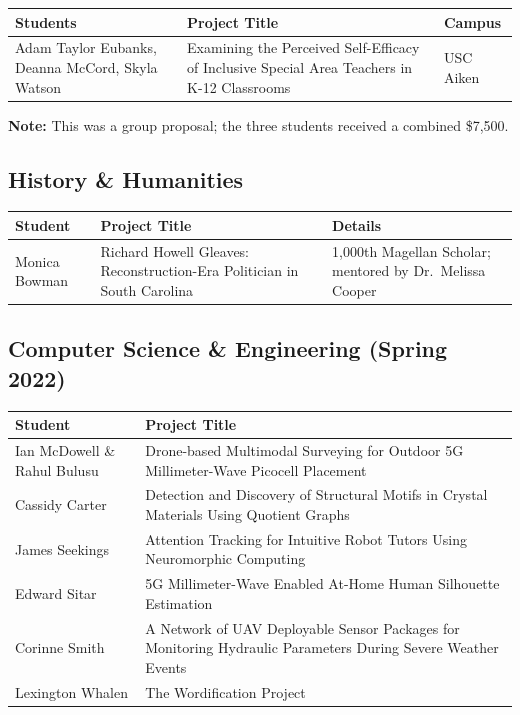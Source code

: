 \documentclass[11pt, letterpaper]{article}
\begin{document}
\begin{longtable}{@{}p{5cm} p{7.5cm} p{2cm}@{}}
\toprule
\textbf{Students} & \textbf{Project Title} & \textbf{Campus} \\
\midrule
\endhead
Adam Taylor Eubanks, Deanna McCord, Skyla Watson & Examining the Perceived Self-Efficacy of Inclusive Special Area Teachers in K-12 Classrooms & USC Aiken \\
\bottomrule
\end{longtable}

\textbf{Note:} This was a group proposal; the three students received a combined \$7,500.

\subsection{History \& Humanities}

\begin{longtable}{@{}p{3.5cm} p{7.5cm} p{3.5cm}@{}}
\toprule
\textbf{Student} & \textbf{Project Title} & \textbf{Details} \\
\midrule
\endhead
Monica Bowman & Richard Howell Gleaves: Reconstruction-Era Politician in South Carolina & 1,000th Magellan Scholar; mentored by Dr.\ Melissa Cooper \\
\bottomrule
\end{longtable}

\subsection{Computer Science \& Engineering (Spring 2022)}

\begin{longtable}{@{}p{3.5cm} p{10.5cm}@{}}
\toprule
\textbf{Student} & \textbf{Project Title} \\
\midrule
\endhead
Ian McDowell \& Rahul Bulusu & Drone-based Multimodal Surveying for Outdoor 5G Millimeter-Wave Picocell Placement \\
Cassidy Carter & Detection and Discovery of Structural Motifs in Crystal Materials Using Quotient Graphs \\
James Seekings & Attention Tracking for Intuitive Robot Tutors Using Neuromorphic Computing \\
Edward Sitar & 5G Millimeter-Wave Enabled At-Home Human Silhouette Estimation \\
Corinne Smith & A Network of UAV Deployable Sensor Packages for Monitoring Hydraulic Parameters During Severe Weather Events \\
Lexington Whalen & The Wordification Project \\
\bottomrule
\end{longtable}
\end{document}
